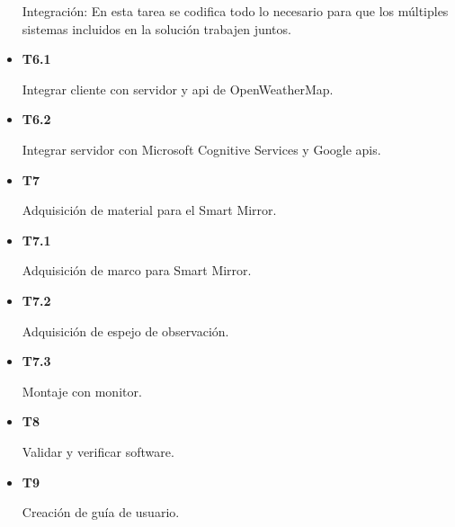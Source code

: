 \begin{itemize}
	Integración: En esta tarea se codifica todo lo necesario para que los múltiples sistemas incluidos en la solución trabajen juntos.
	
	\item \textbf{T6.1}
	
	Integrar cliente con servidor y \acrshort{api} de OpenWeatherMap.
	
	\item \textbf{T6.2}	
	
	Integrar servidor con Microsoft Cognitive Services y Google \acrshort{api}s.
	
	\item \textbf{T7}	
	
	Adquisición de material para el Smart Mirror.
	
	\item \textbf{T7.1}	
	
	Adquisición de marco para Smart Mirror.
	
	\item \textbf{T7.2}
	
	Adquisición de espejo de observación.
	
	\item \textbf{T7.3}	
	
	Montaje con monitor.
	
	\item \textbf{T8}	
	
	Validar y verificar software.
	
	\item \textbf{T9}	
	
	Creación de guía de usuario.

\end{itemize}